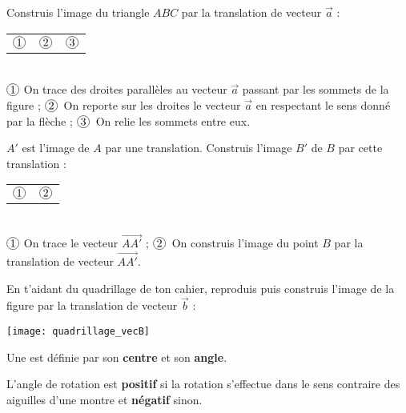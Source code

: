 \begin{methode*1}[La translation]
\begin{exemple*1}
Construis l'image du triangle $ABC$ par la translation de vecteur $\vec{a}$ :
\begin{tabularx}{\linewidth}{X|X|X}
\textcolor{H1}{$\circled{1}$} & \textcolor{H1}{$\circled{2}$} & \textcolor{H1}{$\circled{3}$} \\
\end{tabularx} \\
\textcolor{H1}{$\circled{1}$} On trace des droites parallèles au vecteur $\vec{a}$ passant par les sommets de la figure ;
\textcolor{H1}{$\circled{2}$} On reporte sur les droites le vecteur $\vec{a}$ en respectant le sens donné par la flèche ;
\textcolor{H1}{$\circled{3}$} On relie les sommets entre eux.
 \end{exemple*1}
 
 \begin{exemple*1}
$A'$ est l'image de $A$ par une translation. Construis l'image $B'$ de $B$ par cette translation :
\begin{tabularx}{\linewidth}{X|X}
\textcolor{H1}{$\circled{1}$} & \textcolor{H1}{$\circled{2}$} \\
\end{tabularx} \\
\textcolor{H1}{$\circled{1}$} On trace le vecteur $\vec{AA'}$ ;
\textcolor{H1}{$\circled{2}$} On construis l'image du point $B$ par la translation de vecteur $\vec{AA'}$.
 \end{exemple*1}

 \exercice
En t'aidant du quadrillage de ton cahier, reproduis puis construis l'image de la figure par la translation de vecteur $\vec{b}$ :
\begin{center} \texttt{[image: quadrillage\_vecB]} \end{center}

 \end{methode*1}
 

\begin{aconnaitre}
Une  est définie par son \textbf{centre} et son \textbf{angle}.

L'angle de rotation est \textbf{positif} si la rotation s'effectue dans le sens contraire des aiguilles d'une montre et \textbf{négatif} sinon.
\end{aconnaitre}

